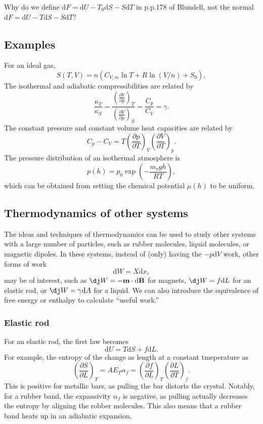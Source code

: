 \documentclass{article}
\theoremstyle{nonumberplain}
\begin{document}
Why do we define $\mathrm{d} F = \mathrm{d} U - T_0 \mathrm{d} S - S \mathrm{d} T$ in p.p.178 of Blundell, not the normal $\mathrm{d} F = \mathrm{d} U - T \mathrm{d} S - S \mathrm{d} T$? 

\subsection{Examples}
For an ideal gas,
\[
    S(T,V) = n (C_{V,m } \ln T + R \ln (V/n) + S_0), 
\]
The isothermal and adiabatic compressibilities are related by 
\[
    \frac{\kappa _{T} }{\kappa _{S} } = 
    \frac{\left( \frac{\partial V}{\partial p} \right)_{T} }{\left( \frac{\partial V}{\partial p} \right)_{S} }
    =\frac{C_p}{C_V} = \gamma.
\]
The constant pressure and constant volume heat capacities are related by
\[
    C_p - C_V = T \left( \frac{\partial p}{\partial T} \right)_{V} \left( \frac{\partial V}{\partial T} \right)_{p}.
\]
The pressure distribution of an isothermal atmosphere is 
\[
    p(h) = p_0 \exp \left(-\frac{m_r g h}{RT}\right),
\]
which can be obtained from setting the chemical potential $\mu(h)$ to be uniform.
\subsection{Thermodynamics of other systems}
The ideas and techniques of thermodynamics can be used to study other systems with a large number of particles, such as rubber molecules, liquid molecules, or magnetic dipoles. In these systems, instead of (only) having the $-p \mathrm{d} V$ work, other forms of work 
\[
    \mathrm{d} W = X \mathrm{d} x,
\]
may be of interest, such as $\mathrm{\dj} W = - \mathbf{m} \cdot \mathrm{d} \mathbf{B}$ for magnets, $\mathrm{\dj} W = f \mathrm{d} L$ for an elastic rod, or $\mathrm{\dj} W = \gamma \mathrm{d} A$ for a liquid.  
We can also introduce the equivalence of free energy or enthalpy to calculate ``useful work.''

\subsubsection{Elastic rod}
For an elastic rod, the first law becomes
\[
    \mathrm{d} U = T \mathrm{d} S + f \mathrm{d} L. 
\]
For example, the entropy of the change as length at a constant tmeperature as
\[
    \left( \frac{\partial S}{\partial L} \right)_{T} = A E_T \alpha_f = \left( \frac{\partial f}{\partial L} \right)_{T} \left( \frac{\partial L}{\partial T} \right)_{f}. 
\]
This is positive for metallic bars, as pulling the bar distorts the crystal. Notably, for a rubber band, the expansivity $\alpha_f$ is negative, as pulling actually decreases the entropy by aligning the robber molecules. This also means that a rubber band heats up in an adiabatic expansion. 
\end{document}
